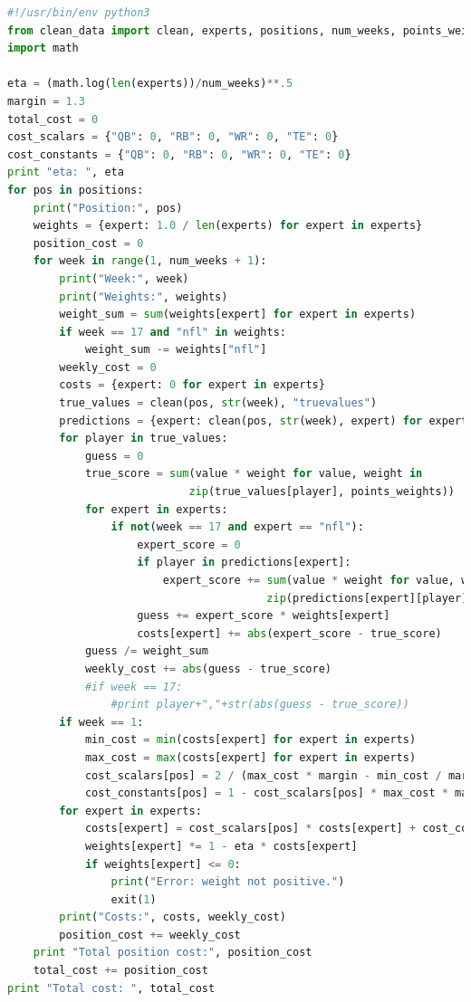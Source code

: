 \documentclass[12pt, final, onecolumn, titlepage]{article}
\theoremstyle{definition}
\begin{document}
\footnotesize
\begin{lstlisting}[basicstyle=\small\ttfamily,breaklines=true,breakatwhitespace=true,language=Python]
#!/usr/bin/env python3
from clean_data import clean, experts, positions, num_weeks, points_weights
import math

eta = (math.log(len(experts))/num_weeks)**.5
margin = 1.3
total_cost = 0
cost_scalars = {"QB": 0, "RB": 0, "WR": 0, "TE": 0}
cost_constants = {"QB": 0, "RB": 0, "WR": 0, "TE": 0}
print "eta: ", eta
for pos in positions:
    print("Position:", pos)
    weights = {expert: 1.0 / len(experts) for expert in experts}
    position_cost = 0
    for week in range(1, num_weeks + 1):
        print("Week:", week)
        print("Weights:", weights)
        weight_sum = sum(weights[expert] for expert in experts)
        if week == 17 and "nfl" in weights:
            weight_sum -= weights["nfl"]
        weekly_cost = 0
        costs = {expert: 0 for expert in experts}
        true_values = clean(pos, str(week), "truevalues")
        predictions = {expert: clean(pos, str(week), expert) for expert in experts}
        for player in true_values:
            guess = 0
            true_score = sum(value * weight for value, weight in
                            zip(true_values[player], points_weights))
            for expert in experts:
                if not(week == 17 and expert == "nfl"):
                    expert_score = 0
                    if player in predictions[expert]:
                        expert_score += sum(value * weight for value, weight in
                                        zip(predictions[expert][player], points_weights))
                    guess += expert_score * weights[expert]
                    costs[expert] += abs(expert_score - true_score)
            guess /= weight_sum
            weekly_cost += abs(guess - true_score)
            #if week == 17:
                #print player+","+str(abs(guess - true_score))
        if week == 1:
            min_cost = min(costs[expert] for expert in experts)
            max_cost = max(costs[expert] for expert in experts)
            cost_scalars[pos] = 2 / (max_cost * margin - min_cost / margin)
            cost_constants[pos] = 1 - cost_scalars[pos] * max_cost * margin
        for expert in experts:
            costs[expert] = cost_scalars[pos] * costs[expert] + cost_constants[pos]
            weights[expert] *= 1 - eta * costs[expert]
            if weights[expert] <= 0:
                print("Error: weight not positive.")
                exit(1)
        print("Costs:", costs, weekly_cost)
        position_cost += weekly_cost
    print "Total position cost:", position_cost
    total_cost += position_cost
print "Total cost: ", total_cost
\end{lstlisting}
\end{document}
